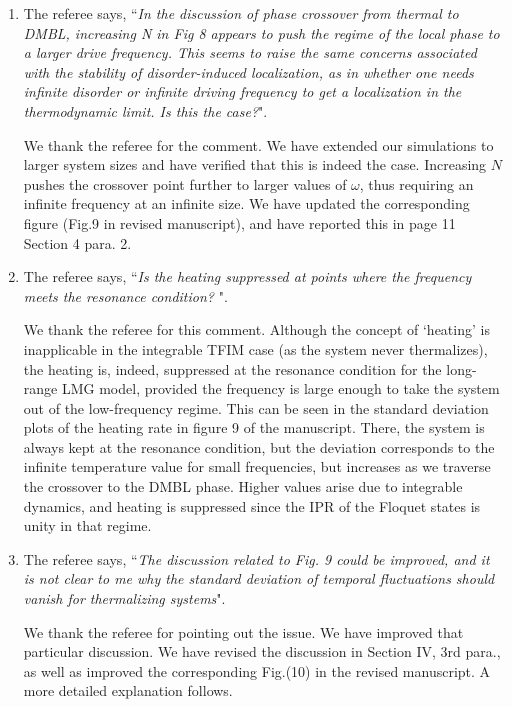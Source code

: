 \documentclass[aps,prb,reprint,showpacs,floatfix,superscriptaddress, onecolumn, nofootinbib, 9pt]{revtex4-2}
\newcommand{\response}[1]{{\color{black}#1}} %
\newcommand{\comment}[1]{{\color{blue}#1}} %
\begin{document}
\begin{enumerate}
		\item The referee says, \comment{``\textit{In the discussion of phase crossover from thermal to DMBL, increasing N in Fig 8 appears to push the regime of the local phase to a larger drive frequency. This seems to raise the same concerns associated with the stability of disorder-induced localization, as in whether one needs infinite disorder or infinite driving frequency to get a localization in the thermodynamic limit. Is this the case?}"}.
		
		\response{    	
			We thank the referee for the comment. We have extended our simulations to larger system sizes and have verified that this is indeed the case. Increasing $N$ pushes the crossover point further to larger values of $\omega$, thus requiring an infinite frequency at an infinite size. We have updated the corresponding figure (Fig.9 in revised manuscript), and have reported this in page 11 Section 4 para. 2.
		}
		\item The referee says, \comment{``\textit{Is the heating suppressed at points where the frequency meets the resonance condition? }"}.
		
		\response{
			We thank the referee for this comment. Although the concept of `heating' is inapplicable in the integrable TFIM case (as the system never thermalizes), the heating is, indeed, suppressed at the resonance condition for the long-range LMG model, provided the frequency is large enough to take the system out of the low-frequency regime. This can be seen in the standard deviation plots of the heating rate in figure 9 of the manuscript. There, the system is always kept at the resonance condition, but the deviation corresponds to the infinite temperature value for small frequencies, but increases as we traverse the crossover to the DMBL phase. Higher values arise due to integrable dynamics, and heating is suppressed since the IPR of the Floquet states is unity in that regime.}
		
		\item The referee says, \comment{``\textit{The discussion related to Fig. 9 could be improved, and it is not clear to me why the standard deviation of temporal fluctuations should vanish for thermalizing systems}"}.\\
		
		\response{ We thank the referee for pointing out the issue. We have improved that particular discussion. We have revised the discussion in Section IV, 3rd para., as well as improved the corresponding Fig.(10) in the revised manuscript. A more detailed explanation follows.
			
}
\end{enumerate}
\end{document}

